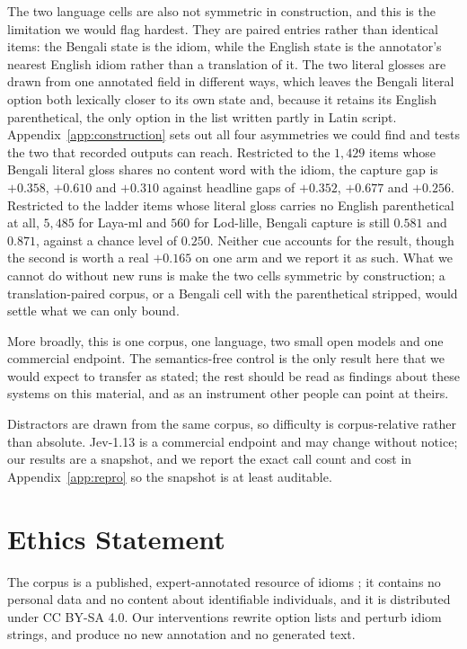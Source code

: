\documentclass[11pt]{article}
\begin{document}
The two language cells are also not symmetric in construction, and this is the
limitation we would flag hardest. They are paired entries rather than identical
items: the Bengali state is the idiom, while the English state is the annotator's
nearest English idiom rather than a translation of it. The two literal glosses are
drawn from one annotated field in different ways, which leaves the Bengali literal
option both lexically closer to its own state and, because it retains its English
parenthetical, the only option in the list written partly in Latin script.
Appendix~\ref{app:construction} sets out all four asymmetries we could find and
tests the two that recorded outputs can reach. Restricted to the $1{,}429$ items
whose Bengali literal gloss shares no content word with the idiom, the capture gap
is $+0.358$, $+0.610$ and $+0.310$ against headline gaps of $+0.352$, $+0.677$ and
$+0.256$. Restricted to the ladder items whose literal gloss carries no English
parenthetical at all, $5{,}485$ for Laya-ml and $560$ for Lod-lille, Bengali capture
is still $0.581$ and $0.871$, against a chance level of $0.250$. Neither cue accounts for the
result, though the second is worth a real $+0.165$ on one arm and we report it as
such. What we cannot do without new runs is make the two cells symmetric by
construction; a translation-paired corpus, or a Bengali cell with the parenthetical
stripped, would settle what we can only bound.

More broadly, this is one corpus, one language, two small open models and one
commercial endpoint. The semantics-free control is the only result here that we
would expect to transfer as stated; the rest should be read as findings about
these systems on this material, and as an instrument other people can point at
theirs.

Distractors are drawn from the same corpus, so difficulty is corpus-relative
rather than absolute. Jev-1.13 is a commercial endpoint and may change without
notice; our results are a snapshot, and we report the exact call count and cost
in Appendix~\ref{app:repro} so the snapshot is at least auditable.


\section*{Ethics Statement}

The corpus is a published, expert-annotated resource of idioms \citep{sakhawat-etal-2026-words}; it contains no
personal data and no content about identifiable individuals, and it is
distributed under CC BY-SA 4.0. Our interventions
rewrite option lists and perturb idiom strings, and produce no new annotation and
no generated text.
\end{document}
